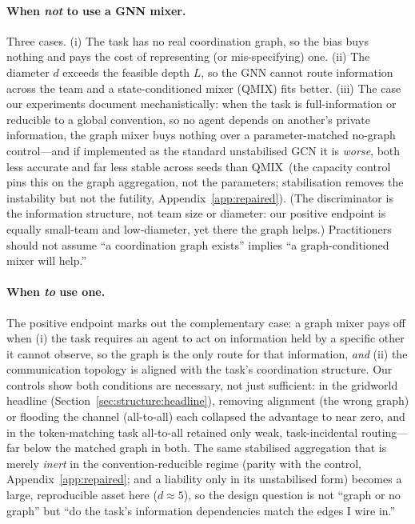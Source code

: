 \documentclass[10pt]{article}
\newcommand{\algoname}[1]{\textsc{#1}}
\newcommand{\qmix}{\algoname{QMIX}}
\begin{document}
\paragraph{When \emph{not} to use a GNN mixer.} Three cases. (i) The task
has no real coordination graph, so the bias buys nothing and pays the cost
of representing (or mis-specifying) one. (ii) The diameter $d$ exceeds the
feasible depth $L$, so the GNN cannot route information across the team and
a state-conditioned mixer (\qmix) fits better. (iii) The case our
experiments document mechanistically: when the task is full-information or
reducible to a global convention, so no agent depends on another's private
information, the graph mixer buys nothing over a parameter-matched no-graph
control---and if implemented as the standard unstabilised GCN it is
\emph{worse}, both less accurate and far less stable across seeds than
\qmix\ (the capacity control pins this on the graph aggregation, not the
parameters; stabilisation removes the instability but not the futility,
Appendix~\ref{app:repaired}). (The discriminator is the information
structure, not team size or diameter: our positive endpoint is equally
small-team and low-diameter, yet there the graph helps.) Practitioners should not assume ``a
coordination graph exists'' implies ``a graph-conditioned mixer will
help.''

\paragraph{When \emph{to} use one.} The positive endpoint marks out the
complementary case: a graph mixer pays off when (i) the task requires an
agent to act on information held by a specific other it cannot observe, so
the graph is the only route for that information, \emph{and} (ii) the
communication topology is aligned with the task's coordination structure. Our
controls show both conditions are necessary, not just sufficient: in the
gridworld headline (Section~\ref{sec:structure:headline}), removing alignment
(the wrong graph) or flooding the channel (all-to-all) each collapsed the
advantage to near zero, and in the token-matching task all-to-all retained only
weak, task-incidental routing---far below the matched graph in both. The same
stabilised aggregation that is merely \emph{inert} in the convention-reducible
regime (parity with the control, Appendix~\ref{app:repaired}; and a liability
only in its unstabilised form) becomes a large, reproducible
asset here ($d\approx5$), so the design question is not ``graph or no graph''
but ``do the task's information dependencies match the edges I wire in.''
\end{document}
